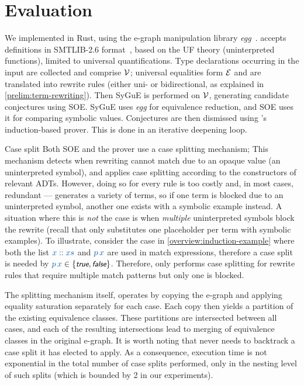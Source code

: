 \section{Evaluation}
\label{thesy:evaluation}

We implemented \TheSy in Rust, using the e-graph manipulation library \emph{egg}~\cite{egg}.
\TheSy accepts definitions in SMTLIB-2.6 format~\cite{TR2017:Barrett},
based on the UF theory (uninterpreted functions),
limited to universal quantifications.
Type declarations occurring in the input are collected and comprise $\mathcal{V}$;
universal equalities form $\mathcal{E}$ and are translated into rewrite rules (either uni- or bidirectional, as explained in \autoref{prelim:term-rewriting}).
Then SyGuE is performed on $\mathcal{V}$, generating candidate conjectures using SOE.
SyGuE uses \emph{egg} for equivalence reduction, and SOE uses it for comparing symbolic values. Conjectures are then dismissed using \TheSy's induction-based prover.
This is done in an iterative deepening loop.

\begin{paragraph}{Case split\quad}
Both SOE and the prover use a case splitting mechanism; This mechanism detects when rewriting cannot match due to an opaque value (an uninterpreted symbol), and applies case splitting according to the constructors of relevant ADTs.
However, doing so for every rule is too costly and, in most cases, redundant --- \TheSy generates a variety of terms, so if one term is blocked due to an uninterpreted symbol, another one exists with a symbolic example instead.
A situation where this is \emph{not} the case is when \emph{multiple} uninterpreted symbols block the rewrite (recall that \TheSy only substitutes one placeholder per term with symbolic examples). 
To illustrate, consider the case in \autoref{overview:induction-example} where both the list $\clrterm x::xs$ and $\clrterm p\,x$ are used in match expressions, therefore a case split is needed by ${\clrterm p\,x} \in \{\ttrue,\tfalse\}$.
Therefore, \TheSy only performs case splitting for rewrite rules that require multiple match patterns but only one is blocked.

The splitting mechanism itself, operates by copying the e-graph and applying equality saturation separately for each case. 
Each copy then yields a partition of the existing equivalence classes. 
These partitions are intersected between all cases, and each of the resulting intersections lead to merging of equivalence classes in the original e-graph.
It is worth noting that \TheSy never needs to backtrack a case split it has elected to apply.
As a consequence, execution time is not exponential in the total number of case splits performed, only in the nesting level of such splits (which is bounded by 2 in our experiments). 
\end{paragraph}

